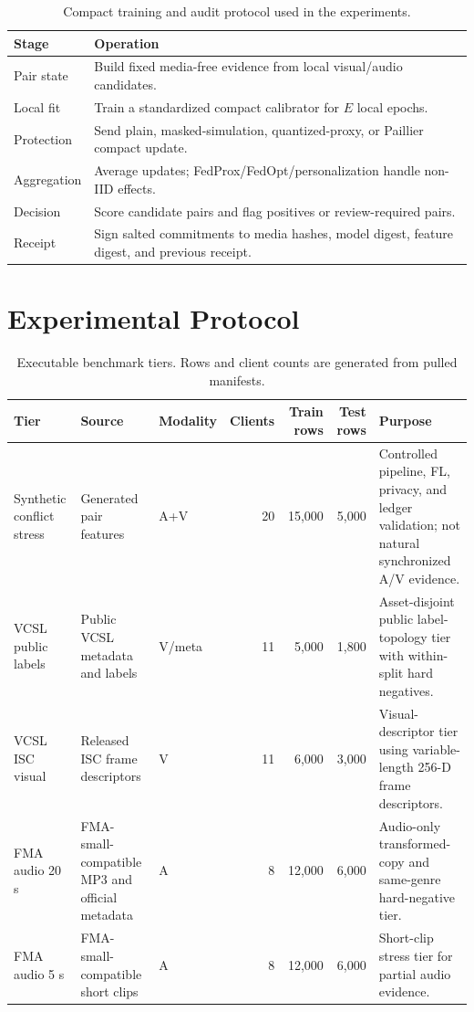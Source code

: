 \documentclass[journal]{IEEEtran}
\begin{document}
\begin{table}[!t]
\centering
\caption{Compact training and audit protocol used in the experiments.}
\label{tab:protocol}
\scriptsize
\begin{tabularx}{\columnwidth}{p{} X}
\toprule
Stage & Operation \\
\midrule
Pair state & Build fixed media-free evidence from local visual/audio candidates. \\
Local fit & Train a standardized compact calibrator for $E$ local epochs. \\
Protection & Send plain, masked-simulation, quantized-proxy, or Paillier compact update. \\
Aggregation & Average updates; FedProx/FedOpt/personalization handle non-IID effects. \\
Decision & Score candidate pairs and flag positives or review-required pairs. \\
Receipt & Sign salted commitments to media hashes, model digest, feature digest, and previous receipt. \\
\bottomrule
\end{tabularx}
\end{table}

\section{Experimental Protocol}

\begin{table}[!t]
\centering
\caption{Executable benchmark tiers. Rows and client counts are generated from pulled manifests.}
\label{tab:benchmark-tiers}
\scriptsize
\begin{tabularx}{\textwidth}{p{} p{} p{} r r r X}
\toprule
Tier & Source & Modality & Clients & Train rows & Test rows & Purpose \\
\midrule
Synthetic conflict stress & Generated pair features & A+V & 20 & 15,000 & 5,000 & Controlled pipeline, FL, privacy, and ledger validation; not natural synchronized A/V evidence. \\
VCSL public labels & Public VCSL metadata and labels & V/meta & 11 & 5,000 & 1,800 & Asset-disjoint public label-topology tier with within-split hard negatives. \\
VCSL ISC visual & Released ISC frame descriptors & V & 11 & 6,000 & 3,000 & Visual-descriptor tier using variable-length 256-D frame descriptors. \\
FMA audio 20 s & FMA-small-compatible MP3 and official metadata & A & 8 & 12,000 & 6,000 & Audio-only transformed-copy and same-genre hard-negative tier. \\
FMA audio 5 s & FMA-small-compatible short clips & A & 8 & 12,000 & 6,000 & Short-clip stress tier for partial audio evidence. \\
\bottomrule
\end{tabularx}
\end{table}
\end{document}
